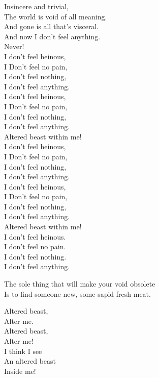 Insincere and trivial, \\
The world is void of all meaning. \\
And gone is all that's visceral. \\
And now I don't feel anything. \\
Never! \\

I don't feel heinous, \\
I Don't feel no pain, \\
I don't feel nothing, \\
I don't feel anything. \\
I don't feel heinous, \\
I Don't feel no pain, \\
I don't feel nothing, \\
I don't feel anything. \\
Altered beast within me! \\

I don't feel heinous, \\
I Don't feel no pain, \\
I don't feel nothing, \\
I don't feel anything. \\
I don't feel heinous, \\
I Don't feel no pain, \\
I don't feel nothing, \\
I don't feel anything. \\
Altered beast within me! \\

I don't feel heinous. \\
I don't feel no pain. \\
I don't feel nothing. \\
I don't feel anything. \\


The sole thing that will make your void obsolete \\
Is to find someone new, some sapid fresh meat. \\


Altered beast, \\
Alter me. \\
Altered beast, \\
Alter me! \\

I think I see \\
An altered beast \\
Inside me! \\

